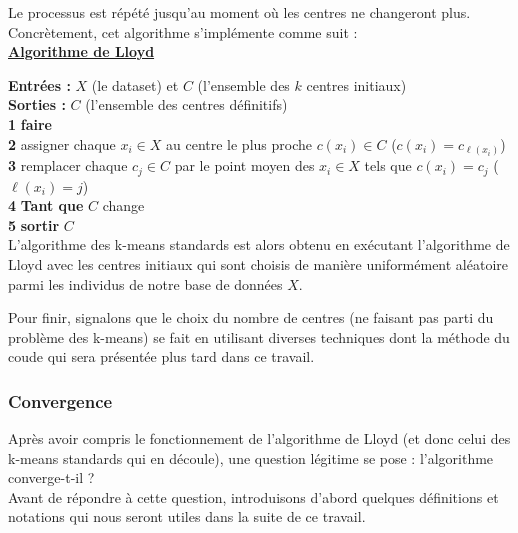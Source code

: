 \documentclass[12pt,a4paper]{book}
\newcommand{\1}{\mathds{1}}
\begin{document}
Le processus est répété jusqu'au moment où les centres ne changeront plus. Concrètement, cet algorithme s'implémente comme suit :  \\

\noindent \textbf{\underline{Algorithme de Lloyd}}\label{algo_lloyd}

\noindent \textbf{Entrées : } $X$ (le dataset) et $C$ (l'ensemble des $k$ centres initiaux)\\
\noindent \textbf{Sorties : } $C$ (l'ensemble des centres définitifs) \\
\textbf{1} \textbf{faire}\\
\textbf{2} \indent assigner chaque $x_i \in X$ au centre le plus proche $c(x_i) \in C$ ($c(x_i) = c_{\ell(x_i)}$)\\
\textbf{3} \indent remplacer chaque $c_j \in C$ par le point moyen des $x_i \in X$ tels que $c(x_i)=c_j$ ($\ell(x_i)=j$)\\
\textbf{4} \textbf{Tant que } $C$ change\\
\textbf{5} \textbf{sortir} $C$\\

L'algorithme des k-means standards est alors obtenu en exécutant l'algorithme de Lloyd avec les centres initiaux qui sont choisis de manière uniformément aléatoire parmi les individus de notre base de données $X$.

Pour finir, signalons que le choix du nombre de centres (ne faisant pas parti du problème des k-means) se fait en utilisant diverses techniques dont la méthode du coude qui sera présentée plus tard dans ce travail.
\subsubsection{Convergence}

Après avoir compris le fonctionnement de l'algorithme de Lloyd (et donc celui des k-means standards qui en découle), une question légitime se pose : l'algorithme converge-t-il ? \\
Avant de répondre à cette question, introduisons d'abord quelques définitions et notations qui nous seront utiles dans la suite de ce travail.
\end{document}
